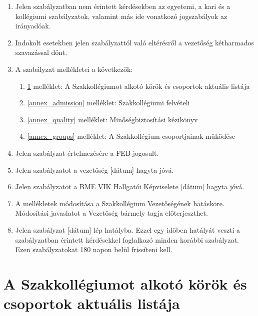 \documentclass[12pt]{report}
\begin{document}
\begin{enumerate}
  \item Jelen szabályzatban nem érintett kérdésekben az egyetemi, a kari és a kollégiumi szabályzatok, valamint más ide vonatkozó jogszabályok az irányadóak.
  \item Indokolt esetekben jelen szabályzattól való eltérésről a vezetőség kétharmados szavazással dönt.
  \item A szabályzat mellékletei a következők:
  \begin{enumerate}
    \item \ref{annex_currents} melléklet: A Szakkollégiumot alkotó körök és csoportok aktuális listája
    \item \ref{annex_admission} melléklet: Szakkollégiumi felvételi
    \item \ref{annex_quality} melléklet: Minőségbiztosítási kézikönyv
    \item \ref{annex_groups} melléklet: A Szakkollégium csoportjainak működése
  \end{enumerate}
  \item Jelen szabályzat értelmezésére a FEB jogosult.
  \item Jelen szabályzatot a vezetőség [dátum] hagyta jóvá.
  \item Jelen szabályzatot a BME VIK Hallgatói Képviselete [dátum] hagyta jóvá.
  \item A mellékletek módosítása a Szakkollégium Vezetőségének hatásköre. Módosítási javaslatot a Vezetőség bármely tagja előterjeszthet.
  \item Jelen szabályzat [dátum] lép hatályba. Ezzel egy időben hatályát veszti a szabályzatban érintett kérdésekkel foglalkozó minden korábbi szabályzat. Ezen szabályzatokat 180 napon belül frissíteni kell.
\end{enumerate}


\appendix
\renewcommand\thechapter{\arabic{chapter}.}
\renewcommand\appendixname{melléklet}

\chapter{A Szakkollégiumot alkotó körök és csoportok aktuális listája} \label{annex_currents}
\end{document}
